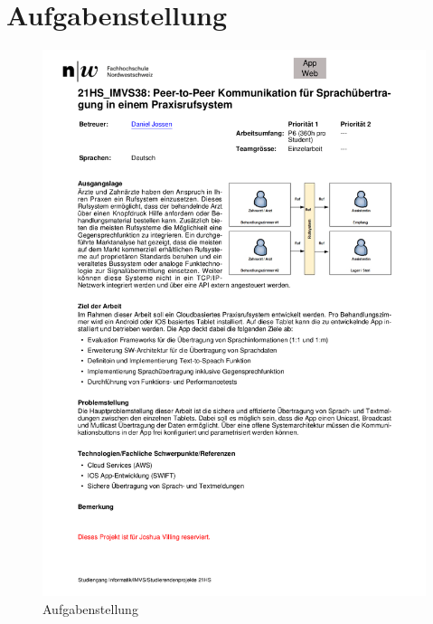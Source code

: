 \section{Aufgabenstellung}\label{sec:aufgabenstellung}
\begin{figure}[h]
    \centering
    \begin{minipage}[b]{0.75\textwidth}
        \includegraphics[width=\textwidth]{graphics/aufgabenstellung}
        \caption{Aufgabenstellung}
    \end{minipage}\label{fig:aufgabenstellung}
\end{figure}

\clearpage
